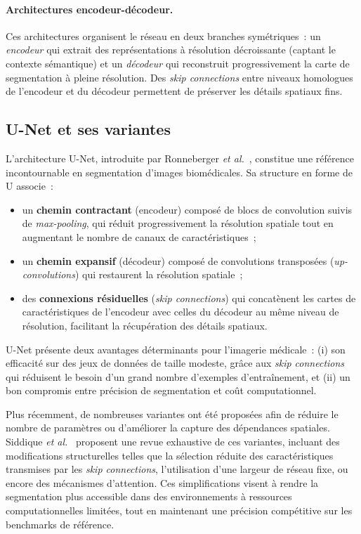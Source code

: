 \documentclass[12pt,a4paper]{article}
\begin{document}
\paragraph{Architectures encodeur-décodeur.} Ces architectures organisent le réseau en deux branches symétriques~: un \emph{encodeur} qui extrait des représentations à résolution décroissante (captant le contexte sémantique) et un \emph{décodeur} qui reconstruit progressivement la carte de segmentation à pleine résolution. Des \emph{skip connections} entre niveaux homologues de l'encodeur et du décodeur permettent de préserver les détails spatiaux fins.

\subsection{U-Net et ses variantes}
\label{subsec:unet}

L'architecture U-Net, introduite par Ronneberger \textit{et al.}~\citep{ronneberger2015unet}, constitue une référence incontournable en segmentation d'images biomédicales. Sa structure en forme de \og U \fg{} associe~:
\begin{itemize}[nosep]
    \item un \textbf{chemin contractant} (encodeur) composé de blocs de convolution suivis de \emph{max-pooling}, qui réduit progressivement la résolution spatiale tout en augmentant le nombre de canaux de caractéristiques~;
    \item un \textbf{chemin expansif} (décodeur) composé de convolutions transposées (\emph{up-convolutions}) qui restaurent la résolution spatiale~;
    \item des \textbf{connexions résiduelles} (\emph{skip connections}) qui concatènent les cartes de caractéristiques de l'encodeur avec celles du décodeur au même niveau de résolution, facilitant la récupération des détails spatiaux.
\end{itemize}

U-Net présente deux avantages déterminants pour l'imagerie médicale~: (i) son efficacité sur des jeux de données de taille modeste, grâce aux \emph{skip connections} qui réduisent le besoin d'un grand nombre d'exemples d'entraînement, et (ii) un bon compromis entre précision de segmentation et coût computationnel.

Plus récemment, de nombreuses variantes ont été proposées afin de réduire le nombre de paramètres ou d'améliorer la capture des dépendances spatiales. Siddique \textit{et al.}~\citep{simple_unet} proposent une revue exhaustive de ces variantes, incluant des modifications structurelles telles que la sélection réduite des caractéristiques transmises par les \emph{skip connections}, l'utilisation d'une largeur de réseau fixe, ou encore des mécanismes d'attention. Ces simplifications visent à rendre la segmentation plus accessible dans des environnements à ressources computationnelles limitées, tout en maintenant une précision compétitive sur les benchmarks de référence.
\end{document}
